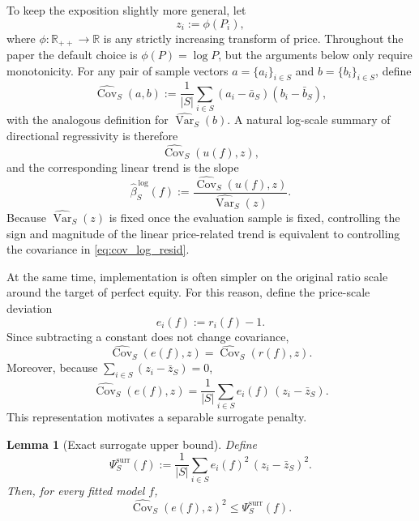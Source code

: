 \documentclass[12pt, draft]{article}
\newtheorem{lemma}{Lemma}
\theoremstyle{plain}
\theoremstyle{definition}
\newcommand{\1}{\mathbf{1}}
\begin{document}
{To keep the exposition slightly more general, let
\[
z_i:=\phi(P_i),
\]
where $\phi:\mathbb{R}_{++}\to\mathbb{R}$ is any strictly increasing transform of price. Throughout the paper the default choice is $\phi(P)=\log P$, but the arguments below only require monotonicity. For any pair of sample vectors $a=\{a_i\}_{i\in S}$ and $b=\{b_i\}_{i\in S}$, define
\begin{equation}
\label{eq:sample_cov_general}
\widehat{\operatorname{Cov}}_S(a,b)
:=
\frac{1}{|S|}
\sum_{i\in S}
(a_i-\bar a_S)(b_i-\bar b_S),
\end{equation}
with the analogous definition for $\widehat{\operatorname{Var}}_S(b)$. A natural log-scale summary of directional regressivity is therefore
\begin{equation}
\label{eq:cov_log_resid}
\widehat{\operatorname{Cov}}_S(u(f),z),
\end{equation}
and the corresponding linear trend is the slope
\begin{equation}
\label{eq:sample_slope_logz}
\widehat\beta^{\,\log}_S(f)
:=
\frac{\widehat{\operatorname{Cov}}_S(u(f),z)}
{\widehat{\operatorname{Var}}_S(z)}.
\end{equation}
Because $\widehat{\operatorname{Var}}_S(z)$ is fixed once the evaluation sample is fixed, controlling the sign and magnitude of the linear price-related trend is equivalent to controlling the covariance in \eqref{eq:cov_log_resid}.

At the same time, implementation is often simpler on the original ratio scale around the target of perfect equity. For this reason, define the price-scale deviation
\[
e_i(f):=r_i(f)-1.
\]
Since subtracting a constant does not change covariance,
\[
\widehat{\operatorname{Cov}}_S(e(f),z)
=
\widehat{\operatorname{Cov}}_S(r(f),z).
\]
Moreover, because $\sum_{i\in S}(z_i-\bar z_S)=0$,
\begin{equation}
\label{eq:cov_linear_form}
\widehat{\operatorname{Cov}}_S(e(f),z)
=
\frac{1}{|S|}
\sum_{i\in S} e_i(f)\,(z_i-\bar z_S).
\end{equation}
This representation motivates a separable surrogate penalty.

\begin{lemma}[Exact surrogate upper bound]
\label{lem:surrogate_upper_bound}
Define
\begin{equation}
\label{eq:surrogate_penalty}
\Psi^{\mathrm{surr}}_S(f)
:=
\frac{1}{|S|}
\sum_{i\in S} e_i(f)^2\,(z_i-\bar z_S)^2.
\end{equation}
Then, for every fitted model $f$,
\begin{equation}
\label{eq:cov_surrogate_bound}
\widehat{\operatorname{Cov}}_S(e(f),z)^2
\le
\Psi^{\mathrm{surr}}_S(f).
\end{equation}
\end{lemma}

}
\end{document}
